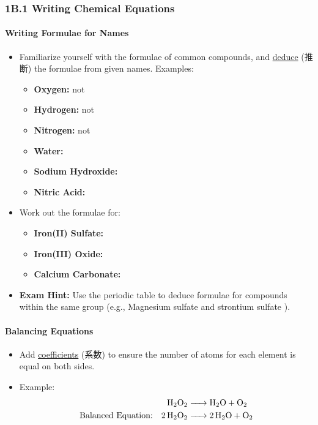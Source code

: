 
\subsubsection{1B.1 Writing Chemical Equations}
\paragraph{Writing Formulae for Names}
\begin{itemize}
    \item Familiarize yourself with the formulae of common compounds, and \underline{deduce} (推断) the formulae from given names.
    Examples:
    \begin{itemize}
        \item \textbf{Oxygen:}  not 
        \item \textbf{Hydrogen:}  not 
        \item \textbf{Nitrogen:}  not 
        \item \textbf{Water:} 
        \item \textbf{Sodium Hydroxide:} 
        \item \textbf{Nitric Acid:} 
    \end{itemize}
    \item Work out the formulae for:
    \begin{itemize}
        \item \textbf{Iron(II) Sulfate:} 
        \item \textbf{Iron(III) Oxide:} 
        \item \textbf{Calcium Carbonate:} 
    \end{itemize}
    \item \textbf{Exam Hint:} Use the periodic table to deduce formulae for compounds within the same group (e.g., Magnesium
    sulfate  and strontium sulfate ).
\end{itemize}

\paragraph{Balancing Equations}
\begin{itemize}
    \item Add \underline{coefficients} (系数) to ensure the number of atoms for each element is equal on both sides.
    \item Example:
    \begin{equation}
        \begin{split}
            \ce{H2O2 &-> H2O + O2} \\
            \text{Balanced Equation:} \quad \ce{2H2O2 &-> 2H2O + O2}
        \end{split}
    \end{equation}
\end{itemize}

